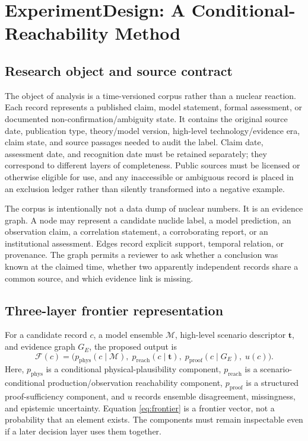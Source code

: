 \documentclass[conference]{IEEEtran}
\begin{document}
\section{ExperimentDesign: A Conditional-Reachability Method}

\subsection{Research object and source contract}

The object of analysis is a time-versioned corpus rather than a nuclear reaction. Each record represents a published claim, model statement, formal assessment, or documented non-confirmation/ambiguity state. It contains the original source date, publication type, theory/model version, high-level technology/evidence era, claim state, and source passages needed to audit the label. Claim date, assessment date, and recognition date must be retained separately; they correspond to different layers of completeness. Public sources must be licensed or otherwise eligible for use, and any inaccessible or ambiguous record is placed in an exclusion ledger rather than silently transformed into a negative example.

The corpus is intentionally not a data dump of nuclear numbers. It is an evidence graph. A node may represent a candidate nuclide label, a model prediction, an observation claim, a correlation statement, a corroborating report, or an institutional assessment. Edges record explicit support, temporal relation, or provenance. The graph permits a reviewer to ask whether a conclusion was known at the claimed time, whether two apparently independent records share a common source, and which evidence link is missing.

\subsection{Three-layer frontier representation}

For a candidate record \(c\), a model ensemble \(\mathcal{M}\), high-level scenario descriptor \(\mathbf{t}\), and evidence graph \(G_E\), the proposed output is
\begin{equation}
\mathcal{F}(c)=\big(p_{\mathrm{phys}}(c\mid\mathcal{M}),\;p_{\mathrm{reach}}(c\mid\mathbf{t}),\;p_{\mathrm{proof}}(c\mid G_E),\;u(c)\big).
\label{eq:frontier}
\end{equation}
Here, $p_{\mathrm{phys}}$ is a conditional physical-plausibility component, $p_{\mathrm{reach}}$ is a scenario-conditional production/observation reachability component, $p_{\mathrm{proof}}$ is a structured proof-sufficiency component, and $u$ records ensemble disagreement, missingness, and epistemic uncertainty. Equation \eqref{eq:frontier} is a frontier vector, not a probability that an element exists. The components must remain inspectable even if a later decision layer uses them together.
\end{document}
